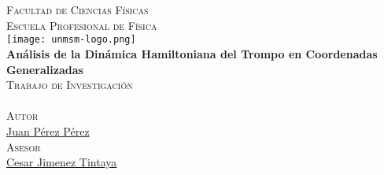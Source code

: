 \documentclass[11pt, oneside]{Thesis} %
\begin{document}
\begin{titlepage}
	\begin{center}
		
		\textsc{\Large \univname}\\[0.5cm] %
		\Large {}\\[0.4cm] %
		\textsc{\Large Facultad de Ciencias Físicas}\\[0.4cm] 
		\textsc{\Large Escuela Profesional de Física}\\[0.8cm] %
		
		\texttt{[image: unmsm-logo.png]}\\[0.7cm] %
		{\LARGE \bfseries Análisis de la Dinámica Hamiltoniana del Trompo en Coordenadas Generalizadas }\\[0.6cm] %
		\textsc{\Large Trabajo de Investigación }\\[0.3cm] 
		\large {}\\[0.6cm] %
		
		\textsc{\Large Autor}\\[0.3cm] 
		\href{http://www.tesista.biz}{Juan Pérez Pérez}\\[0.6cm] %

		\textsc{\Large Asesor}\\[0.3cm] 
		\href{https://ctivitae.concytec.gob.pe/appDirectorioCTI/VerDatosInvestigador.do?id_investigador=0017677}{Cesar Jimenez Tintaya}\\[2.2cm] %
		
		\large {}\\[0.3cm]
		\Large {}\\[0.3cm]
		
		\vfill
	\end{center}
	
\end{titlepage}


\end{document}

